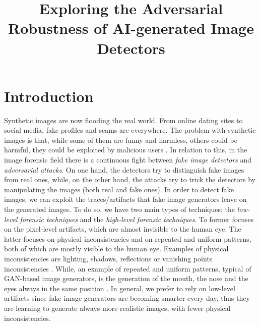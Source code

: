\documentclass[conference]{IEEEtran} %
\begin{document}
\title{Exploring the Adversarial Robustness of AI-generated Image Detectors}

\author{
}

\maketitle

\begin{abstract}
\end{abstract}

\section{Introduction}
    Synthetic images are now flooding the real world. From online dating sites to social media, fake profiles and scams are everywhere. The problem with synthetic images is that, while some of them are funny and harmless, others could be harmful, they could be exploited by malicious users \cite{carlini2020evading}. In relation to this, in the image forensic field there is a continuous fight between \textit{fake image detectors} and \textit{adversarial attacks}. On one hand, the detectors try to distinguish fake images from real ones, while, on the other hand, the attacks try to trick the detectors by manipulating the images (both real and fake ones). In order to detect fake images, we can exploit the traces/artifacts that fake image generators leave on the generated images. To do so, we have two main types of techniques: the \textit{low-level forensic techniques} and the \textit{high-level forensic techniques}. To former focuses on the pixel-level artifacts, which are almost invisible to the human eye. The latter focuses on physical inconsistencies and on repeated and uniform patterns, both of which are mostly visible to the human eye. Examples of physical inconsistencies are lighting, shadows, reflections or vanishing points inconsistencies \cite{farid2022lighting}\cite{farid2022perspective}. While, an example of repeated and uniform patterns, typical of GAN-based image generators, is the generation of the mouth, the nose and the eyes always in the same position \cite{mundra2023exposing}. In general, we prefer to rely on low-level artifacts since fake image generators are becoming smarter every day, thus they are learning to generate always more realistic images, with fewer physical inconsistencies.
\end{document}
